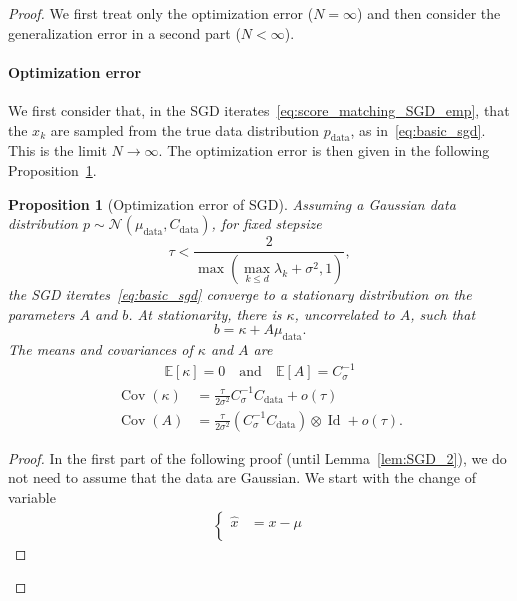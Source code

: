 \documentclass[11pt]{article}
\newtheorem{prop}{Proposition}
\newcommand{\id}{\operatorname{Id}}
\newcommand{\EE}{\mathbb{E}}
\newcommand{\cov}{\operatorname{Cov}}
\begin{document}
\begin{proof}
We first treat only the optimization error ($N = \infty$) and then consider the generalization error in a second part ($N < \infty$). 
\paragraph{Optimization error} We first consider that, in the SGD iterates~\eqref{eq:score_matching_SGD_emp}, that the $x_k$ are sampled from the true data distribution $p_\mathrm{data}$, as in~\eqref{eq:basic_sgd}. This is the limit $N \to \infty$. The optimization error is then given in the following Proposition~\ref{prop:optim_error}. 
\begin{prop}[Optimization error of SGD] \label{prop:optim_error}
Assuming a Gaussian data distribution ${p \sim \mathcal{N}(\mu_\mathrm{data}, C_\mathrm{data})}$, for fixed stepsize $$\tau < \frac{2}{\max\left( \max_{k\leq d}{\lambda_k} + \sigma^2, 1 \right) },$$ the SGD iterates~\eqref{eq:basic_sgd} converge  to a stationary distribution on the parameters $A$ and $b$. At stationarity, there is $\kappa$, uncorrelated to $A$, such that
$$ b = \kappa + A \mu_\mathrm{data} .$$
The means and covariances of $\kappa$ and $A$ are
\begin{align*}
 \EE[\kappa] = 0 \quad\text{and}\quad \EE[A] = C_\sigma^{-1}
\end{align*}
\begin{align*}
\cov(\kappa) &=  \frac{\tau}{2\sigma^2} C_\sigma^{-1}C_\mathrm{data} + o(\tau) \\
\cov(A) &=  \frac{\tau}{2\sigma^2}  (C_\sigma^{-1}C_\mathrm{data}) \otimes \id + o(\tau).
\end{align*}
\end{prop}
\begin{proof}
In the first part of the following proof (until Lemma~\ref{lem:SGD_2}), we do not need to assume that the data are Gaussian. We start with the change of variable
\begin{align*}
    \left \{ \begin{aligned}
        \hat x &= x - \mu \\

\end{aligned}
\end{align*}
\end{proof}
\end{proof}
\end{document}
